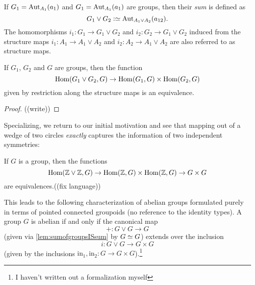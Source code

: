 \begin{definition}
  \label{def:sumofgroup}
  If $G_1=\aut_{A_1}(a_1)$ and $G_1=\aut_{A_1}(a_1)$ are groups, then their \emph{sum} is defined as
  $$G_1\vee G_2\defequi \aut_{A_1\vee A_2}(a_{12}).$$ The homomorphisms $i_1:G_1\to G_1\vee G_2$ and $i_2:G_2\to G_1\vee G_2$ induced from the structure maps  $i_1:A_1\to A_1\vee A_2$ and  $i_2:A_2\to A_1\vee A_2$ are also referred to as structure maps.
\end{definition}
\begin{lemma}
  \label{lem:sumofgroupsISsum} If $G_1$, $G_2$ and $G$ are groups, then the function
  $$\Hom(G_1\vee G_2,G)\to\Hom(G_1,G)\times\Hom(G_2,G)$$ 
given by restriction along the structure maps is an equivalence.
\end{lemma}
\begin{proof}
  ((write))
\end{proof}
Specializing, we return to our initial motivation and see that mapping out of a wedge of two circles \emph{exactly} captures the information of two independent symmetries:
\begin{corollary}
  \label{cor:ZplusZuniv}
  If $G$ is a group, then the functions
  $$\Hom(\ZZ\vee\ZZ,G)\to \Hom(\ZZ,G)\times\Hom(\ZZ,G)\to G\times G$$
  are equivalences.((fix language))
\end{corollary}
\begin{xca}
This leads to the following characterization of abelian groups formulated purely in terms of pointed connected groupoids (no reference to the identity types).
  \label{xca:whatAREabeliangroups}
  A group $G$ is abelian if and only if the canonical map 
$$+:G\vee G\to G$$ 
(given via \cref{lem:sumofgroupsISsum} by $G\oldequiv G$) extends over the inclusion 
$$i:G\vee G\to G\times G$$ 
(given by the inclusions $\mathrm{in}_1,\mathrm{in}_2:G\to G\times G$).\footnote{I haven't written out a formalization myself}
\end{xca}





